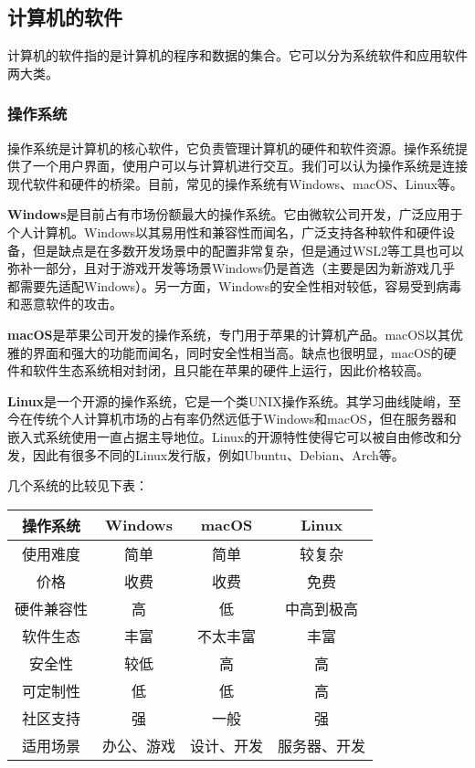 \subsection{计算机的软件}

计算机的软件指的是计算机的程序和数据的集合。它可以分为系统软件和应用软件两大类。

\subsubsection{操作系统}

操作系统是计算机的核心软件，它负责管理计算机的硬件和软件资源。操作系统提供了一个用户界面，使用户可以与计算机进行交互。我们可以认为操作系统是连接现代软件和硬件的桥梁。目前，常见的操作系统有Windows、macOS、Linux等。

\textbf{Windows}\faWindows 是目前占有市场份额最大的操作系统。它由微软公司开发，广泛应用于个人计算机。Windows以其易用性和兼容性而闻名，广泛支持各种软件和硬件设备，但是缺点是在多数开发场景中的配置非常复杂，但是通过WSL2等工具也可以弥补一部分，且对于游戏开发等场景Windows仍是首选（主要是因为新游戏几乎都需要先适配Windows）。另一方面，Windows的安全性相对较低，容易受到病毒和恶意软件的攻击。

\textbf{macOS}\faApple 是苹果公司开发的操作系统，专门用于苹果的计算机产品。macOS以其优雅的界面和强大的功能而闻名，同时安全性相当高。缺点也很明显，macOS的硬件和软件生态系统相对封闭，且只能在苹果的硬件上运行，因此价格较高。

\textbf{Linux}\faLinux 是一个开源的操作系统，它是一个类UNIX操作系统。其学习曲线陡峭，至今在传统个人计算机市场的占有率仍然远低于Windows和macOS，但在服务器和嵌入式系统使用一直占据主导地位。Linux的开源特性使得它可以被自由修改和分发，因此有很多不同的Linux发行版，例如Ubuntu、Debian、Arch等。

几个系统的比较见下表：

\begin{table}[ht]
  \centering
  \begin{tabular}{c|ccc}
    \toprule
    操作系统 & Windows & macOS & Linux \\
    \midrule
    使用难度 & 简单 & 简单 & 较复杂 \\
    价格 & 收费 & 收费 & 免费 \\
    硬件兼容性 & 高 & 低 & 中高到极高 \\
    软件生态 & 丰富 & 不太丰富 & 丰富 \\
    安全性 & 较低 & 高 & 高 \\
    可定制性 & 低 & 低 & 高 \\
    社区支持 & 强 & 一般 & 强 \\
    适用场景 & 办公、游戏 & 设计、开发 & 服务器、开发 \\
    \bottomrule
  \end{tabular}
\end{table}

